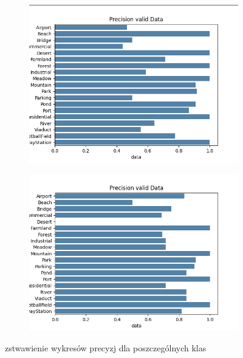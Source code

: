 \documentclass[12pt,twoside]{article}
\begin{document}
\begin{figure}[ht]
	\centering
	\begin{subfigure}[b]{0.45\textwidth}
	  \includegraphics[width=\textwidth]{figures/barv3_exp2.png}
	  \label{fig:obraz1}
	\end{subfigure}
	\hfill
	\begin{subfigure}[b]{0.45\textwidth}
	  \includegraphics[width=\textwidth]{figures/barMM_exp2.png}
	  \label{fig:obraz2}
	\end{subfigure}
	\caption{zstwawienie wykresów precyzj dla poszczególnych klas}
	
\end{figure}
\end{document}
